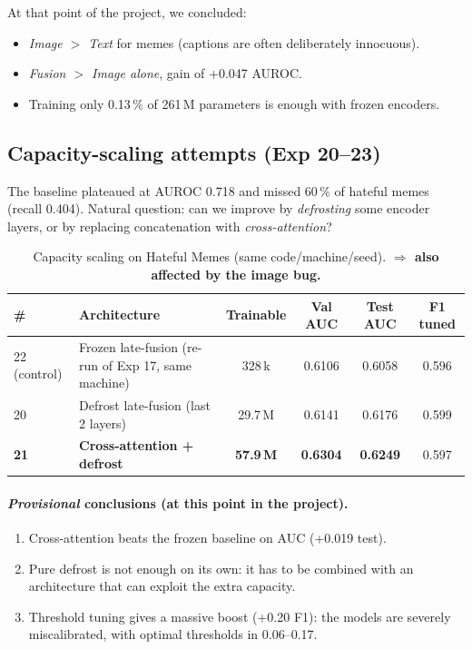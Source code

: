 \documentclass[11pt,a4paper]{article}
\begin{document}
At that point of the project, we concluded:
\begin{itemize}[leftmargin=*]
    \item \emph{Image $>$ Text} for memes (captions are often deliberately
    innocuous).
    \item \emph{Fusion $>$ Image alone}, gain of +0.047 AUROC.
    \item Training only 0.13\,\% of 261\,M parameters is enough with frozen
    encoders.
\end{itemize}

\subsection{Capacity-scaling attempts (Exp 20--23)}

The baseline plateaued at AUROC 0.718 and missed 60\,\% of hateful memes
(recall 0.404). Natural question: can we improve by \emph{defrosting} some encoder
layers, or by replacing concatenation with \emph{cross-attention}?

\begin{table}[h]
\centering\small
\caption{Capacity scaling on Hateful Memes (same code/machine/seed). \textbf{$\Rightarrow$
also affected by the image bug.}}
\begin{tabular}{l l c c c c}
\toprule
\# & Architecture & Trainable & Val AUC & Test AUC & F1 tuned \\
\midrule
22 (control) & Frozen late-fusion (re-run of Exp 17, same machine) & 328\,k & 0.6106 & 0.6058 & 0.596 \\
20 & Defrost late-fusion (last 2 layers)              & 29.7\,M & 0.6141 & 0.6176 & 0.599 \\
\textbf{21} & \textbf{Cross-attention + defrost}      & \textbf{57.9\,M} & \textbf{0.6304} & \textbf{0.6249} & 0.597 \\
\bottomrule
\end{tabular}
\end{table}

\paragraph{\emph{Provisional} conclusions (at this point in the project).}
\begin{enumerate}[leftmargin=*]
    \item Cross-attention beats the frozen baseline on AUC (+0.019 test).
    \item Pure defrost is not enough on its own: it has to be combined with an
    architecture that can exploit the extra capacity.
    \item Threshold tuning gives a massive boost (+0.20 F1): the models are
    severely miscalibrated, with optimal thresholds in 0.06--0.17.
\end{enumerate}
\end{document}
